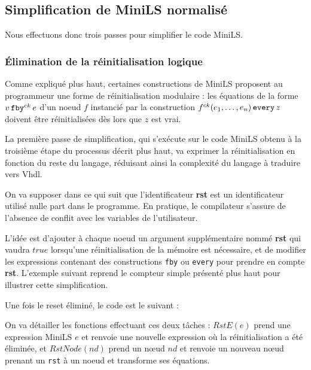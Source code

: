 \documentclass[a4paper]{article}
\newcommand{\minils}{{\sc MiniLS}}
\newcommand{\vhdl}{{\sc Vhdl}}
\newcommand{\mybox}[1]{\mbox{\tt{#1}}}
\newcommand{\Fby}[2]{#1 \, \mybox{fby}^{ck} \, #2}
\newcommand{\Every}[4]{#1^{ck}(#2,\dots,#3) \, \mybox{every} \, #4}
\begin{document}
\subsection{Simplification de MiniLS normalisé}

Nous effectuons donc trois passes pour simplifier le code \minils.

\subsubsection{Élimination de la réinitialisation logique}

Comme expliqué plus haut, certaines constructions de \minils{} proposent au
programmeur une forme de réinitialisation modulaire : les équations de la
forme $\Fby{v}{e}$ d'un noeud $f$ instancié par la construction
$\Every{f}{e_1}{e_n}{z}$ doivent être réinitialisées dès lors que $z$
est vrai.

La première passe de simplification, qui s'exécute sur le code \minils{}
obtenu à la troisième étape du processus décrit plus haut, va exprimer
la réinitialisation en fonction du reste du langage, réduisant ainsi la
complexité du langage à traduire vers \vhdl{}.

On va supposer dans ce qui suit que l'identificateur \textbf{rst} est un
identificateur utilisé nulle part dans le programme. En pratique, le compilateur
s'assure de l'absence de conflit avec les variables de l'utilisateur.

L'idée est d'ajouter à chaque noeud un argument supplémentaire nommé
\textbf{rst} qui vaudra $true$ lorsqu'une réinitialisation de la mémoire est
nécessaire, et de modifier les expressions contenant des constructions
\texttt{fby} ou \texttt{every} pour prendre en compte \textbf{rst}. L'exemple
suivant reprend le compteur simple présenté plus haut pour illustrer cette
simplification.



Une fois le reset éliminé, le code est le suivant :



On va détailler les fonctions effectuant ces deux tâches : $RstE(e)$ prend
une expression \minils{} $e$ et renvoie une nouvelle expression où la
réinitialisation a été éliminée, et $RstNode(nd)$ prend un nœud $nd$
et renvoie un nouveau nœud prenant un \texttt{rst} à un noeud et transforme
ses équations.

\newcommand{\re}[1]{RstE(#1)}
\newcommand{\rstn}[1]{RstNode(#1)}
\end{document}
